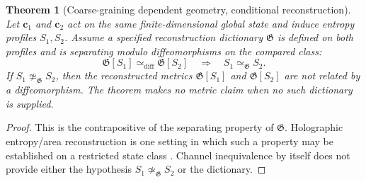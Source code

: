 \documentclass[12pt,a4paper,openany]{book}
\newtheorem{theorem}{Theorem}[chapter]
\begin{document}
\begin{theorem}[Coarse-graining dependent geometry, conditional reconstruction]
\label{H-A-thm:geom}
Let $\mathbf{c}_1$ and $\mathbf{c}_2$ act on the same finite-dimensional global state and induce entropy profiles $S_1,S_2$.  Assume a specified reconstruction dictionary $\mathfrak G$ is defined on both profiles and is separating modulo diffeomorphisms on the compared class:
\[
\mathfrak G[S_1]\simeq_{\mathrm{diff}}\mathfrak G[S_2]
\quad\Longrightarrow\quad
S_1\simeq_{\mathfrak G}S_2.
\]
If $S_1\not\simeq_{\mathfrak G}S_2$, then the reconstructed metrics $\mathfrak G[S_1]$ and $\mathfrak G[S_2]$ are not related by a diffeomorphism.  The theorem makes no metric claim when no such dictionary is supplied.
\end{theorem}

\begin{proof}
This is the contrapositive of the separating property of $\mathfrak G$.  Holographic entropy/area reconstruction is one setting in which such a property may be established on a restricted state class \cite{RyuTakayanagi2006}.  Channel inequivalence by itself does not provide either the hypothesis $S_1\not\simeq_{\mathfrak G}S_2$ or the dictionary.
\end{proof}
\end{document}
